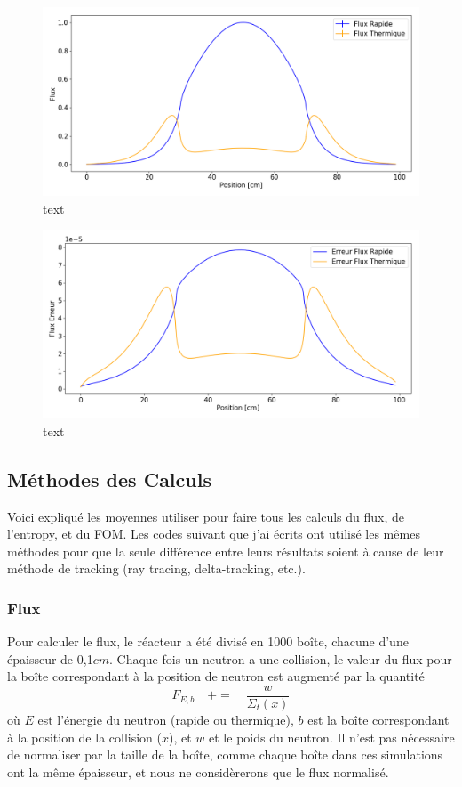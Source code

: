 \documentclass{article}
\begin{document}
		\begin{figure}[H]
			\centering
			\includegraphics[scale=0.5]{mcnp_flux.png}
			\caption{text}
			\label{fig:mcnp_flux}
		\end{figure}
	
		\begin{figure}[H]
			\centering
			\includegraphics[scale=0.5]{mcnp_flux_erreur.png}
			\caption{text}
			\label{fig:mcnp_flux_erreur}
		\end{figure}
	
		\subsection{Méthodes des Calculs}
			Voici expliqué les moyennes utiliser pour faire tous les calculs du flux, de l'entropy, et du FOM. Les codes suivant que j'ai écrits ont utilisé les mêmes méthodes pour que la seule différence entre leurs résultats soient à cause de leur méthode de tracking (ray tracing, delta-tracking, etc.).
			\subsubsection{Flux}
			Pour calculer le flux, le réacteur a été divisé en 1000 boîte, chacune d'une épaisseur de 0,1$cm$. Chaque fois un neutron a une collision, le valeur du flux pour la boîte correspondant à la position de neutron est augmenté par la quantité
			\begin{equation*}
				F_{E,b} \quad += \quad \frac{w}{\Sigma_t(x)}
			\end{equation*}
			où $E$ est l'énergie du neutron (rapide ou thermique), $b$ est la boîte correspondant à la position de la collision ($x$), et $w$ et le poids du neutron. Il n'est pas nécessaire de normaliser par la taille de la boîte, comme chaque boîte dans ces simulations ont la même épaisseur, et nous ne considèrerons que le flux normalisé. 
			
\end{document}
